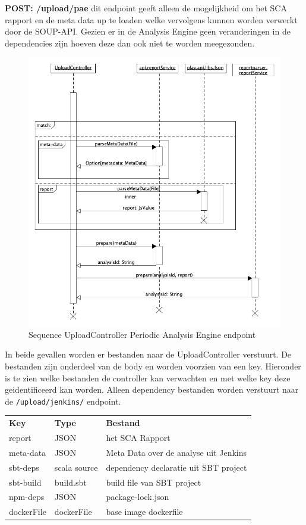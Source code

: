 \textbf{POST: /upload/pae} dit endpoint geeft alleen de mogelijkheid om het SCA rapport en de meta data up te loaden welke vervolgens kunnen worden verwerkt door de SOUP-API. Gezien er in de Analysis Engine geen veranderingen in de dependencies zijn hoeven deze dan ook niet te worden meegezonden.

\begin{figure}[bth]
    \myfloatalign
    \includegraphics[width=12cm]{gfx/umlet/exports/SequploadController-pae}
    \caption{Sequence UploadController Periodic Analysis Engine endpoint}
    \label{fig:SequenceUploadReportpaet}
\end{figure}

In beide gevallen worden er bestanden naar de UploadController verstuurt. De bestanden zijn onderdeel van de body en worden voorzien van een key. Hieronder is te zien welke bestanden de controller kan verwachten en met welke key deze geidentificeerd kan worden. Alleen dependency bestanden worden verstuurt naar de \texttt{/upload/jenkins/} endpoint.

\begin{tabular}{lll}
    \textbf{Key} & \textbf{Type} & \textbf{Bestand} \\
    report & JSON & het SCA Rapport \\
    meta-data & JSON & Meta Data over de analyse uit Jenkins \\
    sbt-deps & scala source & dependency declaratie uit SBT project \\
    sbt-build & build.sbt  & build file van SBT project\\
    npm-deps & JSON & package-lock.json \\
    dockerFile & dockerFile & base image dockerfile
\end{tabular} \\

